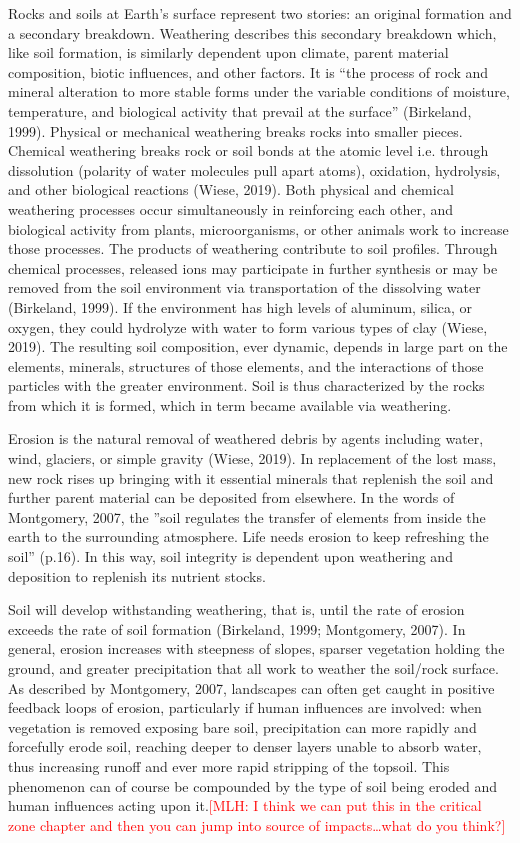 \documentclass{book}\usepackage{knitr}
\newcommand{\red}[1]{\textcolor{red}{[MLH: #1]}}
\begin{document}
\begin{knitrout}
\begin{kframe}
Rocks and soils at Earth’s surface represent two stories: an original formation and a secondary breakdown. Weathering describes this secondary breakdown which, like soil formation, is similarly dependent upon climate, parent material composition, biotic influences, and other factors. It is “the process of rock and mineral alteration to more stable forms under the variable conditions of moisture, temperature, and biological activity that prevail at the surface” (Birkeland, 1999). Physical or mechanical weathering breaks rocks into smaller pieces. Chemical weathering breaks rock or soil bonds at the atomic level i.e. through dissolution (polarity of water molecules pull apart atoms), oxidation, hydrolysis, and other biological reactions (Wiese, 2019). Both physical and chemical weathering processes occur simultaneously in reinforcing each other, and biological activity from plants, microorganisms, or other animals work to increase those processes. The products of weathering contribute to soil profiles. Through chemical processes, released ions may participate in further synthesis or may be removed from the soil environment via transportation of the dissolving water (Birkeland, 1999). If the environment has high levels of aluminum, silica, or oxygen, they could hydrolyze with water to form various types of clay (Wiese, 2019). The resulting soil composition, ever dynamic, depends in large part on the elements, minerals, structures of those elements, and the interactions of those particles with the greater environment. Soil is thus characterized by the rocks from which it is formed, which in term became available via weathering.

Erosion is the natural removal of weathered debris by agents including water, wind, glaciers, or simple gravity (Wiese, 2019). In replacement of the lost mass, new rock rises up bringing with it essential minerals that replenish the soil and further parent material can be deposited from elsewhere. In the words of Montgomery, 2007, the ''soil regulates the transfer of elements from inside the earth to the surrounding atmosphere. Life needs erosion to keep refreshing the soil'' (p.16). In this way, soil integrity is dependent upon weathering and deposition to replenish its nutrient stocks.

Soil will develop withstanding weathering, that is, until the rate of erosion exceeds the rate of soil formation (Birkeland, 1999; Montgomery, 2007). In general, erosion increases with steepness of slopes, sparser vegetation holding the ground, and greater precipitation that all work to weather the soil/rock surface. As described by Montgomery, 2007, landscapes can often get caught in positive feedback loops of erosion, particularly if human influences are involved: when vegetation is removed exposing bare soil, precipitation can more rapidly and forcefully erode soil, reaching deeper to denser layers unable to absorb water, thus increasing runoff and ever more rapid stripping of the topsoil. This phenomenon can of course be compounded by the type of soil being eroded and human influences acting upon it.\red{I think we can put this in the critical zone chapter and then you can jump into source of impacts\ldots what do you think?}


\end{kframe}
\end{knitrout}
\end{document}
